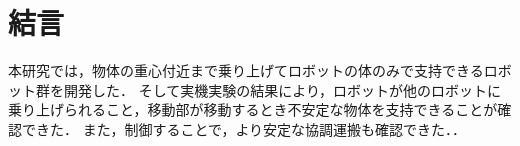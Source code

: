 \section{結言}
本研究では，物体の重心付近まで乗り上げてロボットの体のみで支持できるロボット群を開発した．
そして実機実験の結果により，ロボットが他のロボットに乗り上げられること，移動部が移動するとき不安定な物体を支持できることが確認できた．
また，制御することで，より安定な協調運搬も確認できた．．